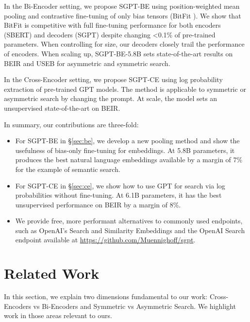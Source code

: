 \documentclass{article}
\begin{document}
In the Bi-Encoder setting, we propose SGPT-BE using position-weighted mean pooling and contrastive fine-tuning of only bias tensors (BitFit \cite{zaken2021bitfit}). We show that BitFit is competitive with full fine-tuning performance for both encoders (SBERT) \cite{reimers2019sentence} and decoders (SGPT) despite changing <0.1\% of pre-trained parameters. When controlling for size, our decoders closely trail the performance of encoders. When scaling up, SGPT-BE-5.8B sets state-of-the-art results on BEIR and USEB for asymmetric and symmetric search.

In the Cross-Encoder setting, we propose SGPT-CE using log probability extraction of pre-trained GPT models. The method is applicable to symmetric or asymmetric search by changing the prompt. At scale, the model sets an unsupervised state-of-the-art on BEIR.

In summary, our contributions are three-fold:
\begin{itemize}
    \item For SGPT-BE in \S\ref{sec:be}, we develop a new pooling method and show the usefulness of bias-only fine-tuning for embeddings. At 5.8B parameters, it produces the best natural language embeddings available by a margin of 7\% for the example of semantic search.
    \item For SGPT-CE in \S\ref{sec:ce}, we show how to use GPT for search via log probabilities without fine-tuning. At 6.1B parameters, it has the best unsupervised performance on BEIR by a margin of 8\%.
    \item We provide free, more performant alternatives to commonly used endpoints, such as OpenAI's Search and Similarity Embeddings and the OpenAI Search endpoint available at \url{https://github.com/Muennighoff/sgpt}.
\end{itemize}













\section{Related Work}\label{sec:background}

In this section, we explain two dimensions fundamental to our work: Cross-Encoders vs Bi-Encoders and Symmetric vs Asymmetric Search. We highlight work in those areas relevant to ours.
\end{document}
